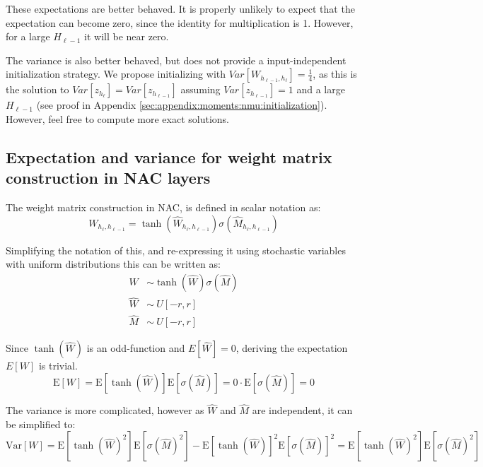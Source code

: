 These expectations are better behaved. It is properly unlikely to expect that the expectation can become zero, since the identity for multiplication is 1. However, for a large $H_{\ell-1}$ it will be near zero.

The variance is also better behaved, but does not provide a input-independent initialization strategy. We propose initializing with $Var[W_{h_{\ell-1},h_\ell}] = \frac{1}{4}$, as this is the solution to $Var[z_{h_\ell}] = Var[z_{h_{\ell-1}}]$ assuming $Var[z_{h_{\ell-1}}] = 1$ and a large $H_{\ell-1}$ (see proof in Appendix \ref{sec:appendix:moments:nmu:initialization}). However, feel free to compute more exact solutions.

\subsection{Expectation and variance for weight matrix construction in NAC layers}
\label{sec:appendix:moments:weight-matrix-construction}

The weight matrix construction in NAC, is defined in scalar notation as: 
\begin{equation}
W_{h_\ell, h_{\ell-1}} = \tanh(\hat{W}_{h_\ell, h_{\ell-1}}) \sigma(\hat{M}_{h_\ell, h_{\ell-1}})
\end{equation}

Simplifying the notation of this, and re-expressing it using stochastic variables with uniform distributions this can be written as:
\begin{equation}
\begin{aligned}
W &\sim \tanh(\hat{W}) \sigma(\hat{M}) \\
\hat{W} &\sim ~ U[-r, r] \\
\hat{M} &\sim ~ U[-r, r] 
\end{aligned}
\end{equation}

Since $\tanh({\hat{W}})$ is an odd-function and $E[\hat{W}] = 0$, deriving the expectation $E[W]$ is trivial.
\begin{equation}
\mathrm{E}[W] = \mathrm{E}[\tanh(\hat{W})]\mathrm{E}[\sigma(\hat{M})] = 0 \cdot \mathrm{E}[\sigma(\hat{M})] = 0
\end{equation}

The variance is more complicated, however as $\hat{W}$ and $\hat{M}$ are independent, it can be simplified to:
\begin{equation}
\mathrm{Var}[W] = \mathrm{E}[\tanh(\hat{W})^2] \mathrm{E}[\sigma(\hat{M})^2] - \mathrm{E}[\tanh(\hat{W})]^2 \mathrm{E}[\sigma(\hat{M})]^2 = \mathrm{E}[\tanh(\hat{W})^2] \mathrm{E}[\sigma(\hat{M})^2]
\end{equation}

